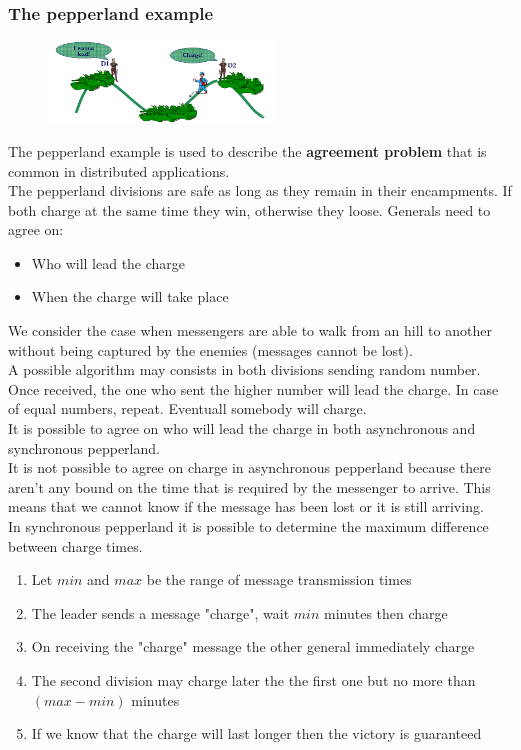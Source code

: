 \documentclass[10pt,a4paper]{article}
\begin{document}
\subsubsection{The pepperland example}
\begin{figure}[h!]
 \hfill \includegraphics[width=170pt]{images/pepperland.png}\hspace*{\fill}
 
  \label{fig:pepperland}
\end{figure}
The pepperland example is used to describe the \textbf{agreement problem} that is common in distributed applications. \\ The pepperland divisions are safe as long as they remain in their encampments. If both charge at the same time they win, otherwise they loose. Generals need to agree on:
\begin{itemize}
	\item Who will lead the charge
	\item When the charge will take place
\end{itemize}
We consider the case when messengers are able to walk from an hill to another without being captured by the enemies (messages cannot be lost). \\
A possible algorithm may consists in both divisions sending random number. Once received, the one who sent the higher number will lead the charge. In case of equal numbers, repeat. Eventuall somebody will charge. \\
It is possible to agree on who will lead the charge in both asynchronous and synchronous pepperland. \\
It is not possible to agree on charge in asynchronous pepperland because there aren't any bound on the time that is required by the messenger to arrive. This means that we cannot know if the message has been lost or it is still arriving. \pagebreak \\
In synchronous pepperland it is possible to determine the maximum difference between charge times.
\begin{enumerate}
	\item Let $min$ and $max$ be the range of message transmission times
	\item The leader sends a message "charge", wait $min$ minutes then charge
	\item On receiving the "charge" message the other general immediately charge
	\item The second division may charge later the the first one but no more than $(max-min)$ minutes
	\item If we know that the charge will last longer then the victory is guaranteed
\end{enumerate}
\end{document}
